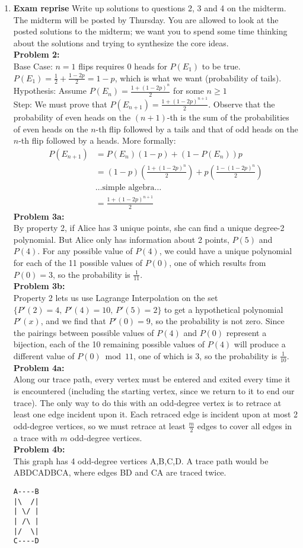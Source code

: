 \documentclass[11pt,fleqn]{article}
\begin{document}
\begin{enumerate}
\newpage
\item \textbf{Exam reprise} Write up solutions to questions 2, 3 and 4 on the midterm. The midterm will be posted 
by Thursday. You are allowed to look at the posted solutions to the midterm; we want you to spend some time thinking about the
solutions and trying to synthesize the core ideas. \\
\textbf{Problem 2:} \\
Base Case: $n=1$ flips requires 0 heads for $P(E_1)$ to be true. $P(E_1) = \frac12+\frac{1-2p}2 = 1-p$, which is what we want (probability of tails). \\
Hypothesis: Assume $P(E_n) = \frac{1+(1-2p)^n}2$ for some $n \geq 1$ \\
Step: We must prove that $P(E_{n+1}) = \frac{1+(1-2p)^{n+1}}2$. Observe that the probability of even heads on the $(n+1)$-th is the sum of the probabilities of even heads on the $n$-th flip followed by a tails and that of odd heads on the $n$-th flip followed by a heads. More formally:
\begin{align*}
P(E_{n+1}) &= P(E_n)(1-p) + (1-P(E_n))p \\
&= (1-p)(\frac{1+(1-2p)^n}2) + p(\frac{1-(1-2p)^n}2) \\
&\ldots \text{simple algebra} \ldots \\
&= \frac{1+(1-2p)^{n+1}}2
\end{align*}
\textbf{Problem 3a:} \\
By property 2, if Alice has 3 unique points, she can find a unique degree-2 polynomial. But Alice only has information about 2 points, $P(5)$ and $P(4)$. For any possible value of $P(4)$, we could have a unique polynomial for each of the 11 possible values of $P(0)$, one of which results from $P(0)=3$, so the probability is $\frac1{11}$. \\
\textbf{Problem 3b:} \\
Property 2 lets us use Lagrange Interpolation on the set $\{P'(2)=4,\,P'(4)=10,\,P'(5)=2\}$ to get a hypothetical polynomial $P'(x)$, and we find that $P'(0)=9$, so the probability is not zero. Since the pairings between possible values of $P(4)$ and $P(0)$ represent a bijection, each of the 10 remaining possible values of $P(4)$ will produce a different value of $P(0) \bmod 11$, one of which is $3$, so the probability is $\frac1{10}$. \\
\textbf{Problem 4a:} \\
Along our trace path, every vertex must be entered and exited every time it is encountered (including the starting vertex, since we return to it to end our trace). The only way to do this with an odd-degree vertex is to retrace at least one edge incident upon it. Each retraced edge is incident upon at most 2 odd-degree vertices, so we must retrace at least $\frac{m}2$ edges to cover all edges in a trace with $m$ odd-degree vertices. \\
\textbf{Problem 4b:} \\
This graph has 4 odd-degree vertices A,B,C,D. A trace path would be ABDCADBCA, where edges BD and CA are traced twice.
\begin{verbatim}
A----B
|\  /|
| \/ |
| /\ |
|/  \|
C----D
\end{verbatim}


\end{enumerate}
\end{document}
